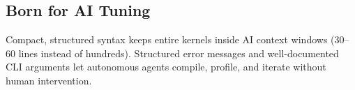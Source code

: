 \subsection*{Born for AI Tuning}

Compact, structured syntax keeps entire kernels inside AI context windows (30--60 lines instead of hundreds). Structured error messages and well-documented CLI arguments let autonomous agents compile, profile, and iterate without human intervention.
